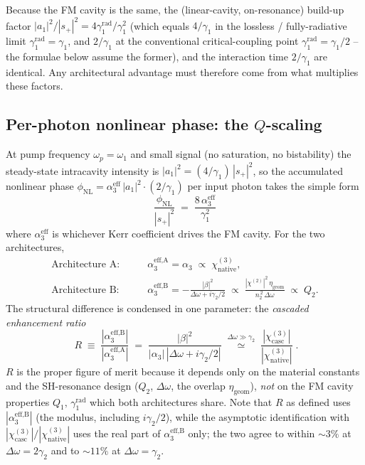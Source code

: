 \documentclass[11pt,a4paper]{article}
\newcommand{\chitwo}{\chi^{(2)}}
\newcommand{\chithree}{\chi^{(3)}}
\newcommand{\Dom}{\Delta\omega}
\begin{document}
\noindent
Because the FM cavity is the same, the (linear-cavity, on-resonance)
build-up factor $|a_1|^{2}/|s_+|^{2}=4\gamma_1^\text{rad}/\gamma_1^{2}$
(which equals $4/\gamma_1$ in the lossless / fully-radiative limit
$\gamma_1^\text{rad}=\gamma_1$, and $2/\gamma_1$ at the conventional
critical-coupling point $\gamma_1^\text{rad}=\gamma_1/2$ -- the
formulae below assume the former), and the
interaction time $2/\gamma_1$ are identical.  Any architectural
advantage must therefore come from what multiplies these factors.

\subsection*{Per-photon nonlinear phase: the $Q$-scaling}

At pump frequency $\omega_p=\omega_1$ and small signal (no saturation,
no bistability) the steady-state intracavity intensity is $|a_1|^{2}=
(4/\gamma_1)\,|s_+|^{2}$, so the accumulated nonlinear phase
$\phi_\text{NL}=\alpha_3^\text{eff}\,|a_1|^{2}\cdot(2/\gamma_1)$ per
input photon takes the simple form
\begin{equation}
  \boxed{\;\frac{\phi_\text{NL}}{|s_+|^{2}}\;=\;\frac{8\,\alpha_3^\text{eff}}{\gamma_1^{2}}\;}
  \label{eq:phi-per-photon}
\end{equation}
where $\alpha_3^\text{eff}$ is whichever Kerr coefficient drives the
FM cavity.  For the two architectures,
\begin{align}
  \text{Architecture A:}\qquad &
   \alpha_3^\text{eff,A}=\alpha_3\;\propto\;\chithree_\text{native},
   \label{eq:alpha-A}\\[3pt]
  \text{Architecture B:}\qquad &
   \alpha_3^\text{eff,B}=-\frac{|\beta|^{2}}{\Dom+i\gamma_2/2}
            \;\propto\;\frac{|\chitwo|^{2}\,\eta_\text{geom}}{n_2^{\,2}\,\Dom}
            \;\propto\;Q_2.
   \label{eq:alpha-B}
\end{align}
The structural difference is condensed in one parameter: the
\emph{cascaded enhancement ratio}
\begin{equation}
  \boxed{\;R\;\equiv\;\frac{|\alpha_3^\text{eff,B}|}{|\alpha_3^\text{eff,A}|}
        \;=\;\frac{|\beta|^{2}}{|\alpha_3|\,|\Dom+i\gamma_2/2|}
        \;\stackrel{\Dom\gg\gamma_2}{\simeq}\;
        \frac{|\chithree_\text{casc}|}{|\chithree_\text{native}|}\;.}
  \label{eq:R-def}
\end{equation}
$R$ is the proper figure of merit because it depends only on the
material constants and the SH-resonance design ($Q_2$, $\Dom$, the
overlap $\eta_\text{geom}$), \emph{not} on the FM cavity properties
$Q_1,\,\gamma_1^\text{rad}$ which both architectures share.  Note that
$R$ as defined uses $|\alpha_3^\text{eff,B}|$ (the modulus, including
$i\gamma_2/2$), while the asymptotic identification with
$|\chithree_\text{casc}|/|\chithree_\text{native}|$ uses the real part
of $\alpha_3^\text{eff,B}$ only; the two agree to within $\sim 3\%$ at
$\Dom=2\gamma_2$ and to $\sim 11\%$ at $\Dom=\gamma_2$.
\end{document}
